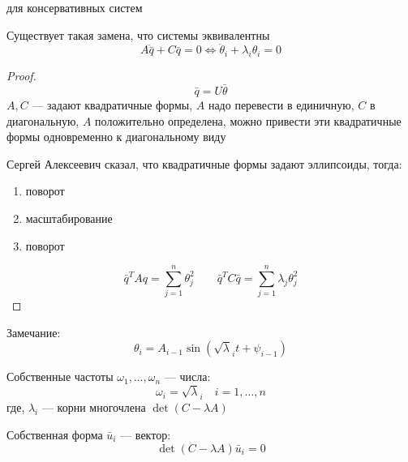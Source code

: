 \documentclass[crop=false]{standalone}
\begin{document}
для консервативных систем

Существует такая замена, что системы эквивалентны
\[A \ddot{\bar q} + C \bar q = 0 \iff \ddot \theta_i + \lambda_i \theta_i = 0\]
\begin{proof}
    \[\bar q = U \bar \theta\]
    $A, C$ — задают квадратичные формы, $A$ надо перевести в единичную, $C$ в диагональную, $A$ положительно определена,  можно привести эти квадратичные формы одновременно к диагональному виду
    
    Сергей Алексеевич сказал, что квадратичные формы задают эллипсоиды, тогда:
    \begin{enumerate}
        \item поворот
        \item масштабирование
        \item поворот
    \end{enumerate}
    \[\bar q^T A q = \sum_{j=1}^{n} \theta_j^2 \qquad \bar q^T C \bar q = \sum_{j=1}^{n} \lambda_j \theta_j^2\]
\end{proof}
Замечание:
\[\theta_i = A_{i - 1} \sin(\sqrt \lambda_i t + \psi_{i-1})\]

\Def Собственные частоты $\omega_1, \dots , \omega_n$ — числа:
\[\omega_i = \sqrt \lambda_i \quad i =1, \dots, n\]
где, $\lambda_i$ — корни многочлена $\det \left(C - \lambda A\right)$

\Def Собственная форма $\bar u_i$ — вектор:
\[\det(C - \lambda A) \bar u_i = 0\]
\end{document}
